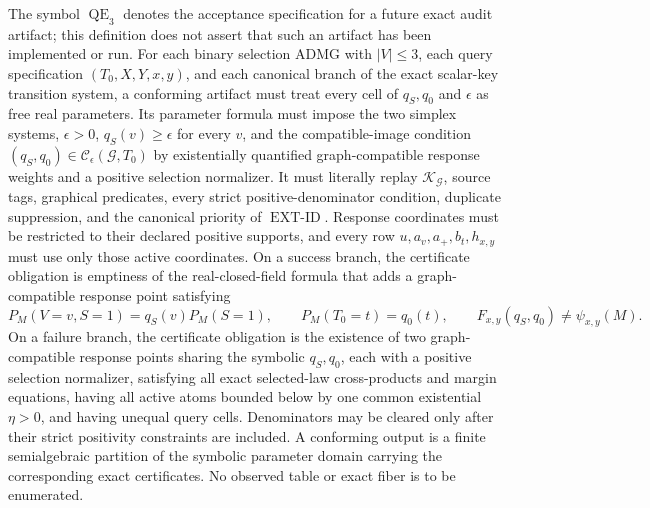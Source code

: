 The symbol \(\operatorname{QE}_3\) denotes the acceptance specification for a future exact audit artifact; this definition does not assert that such an artifact has been implemented or run.  For each binary selection ADMG with \(\lvert V\rvert\leq 3\), each query specification \((T_0,X,Y,x,y)\), and each canonical branch of the exact scalar-key transition system, a conforming artifact must treat every cell of \(q_S,q_0\) and \(\epsilon\) as free real parameters.  Its parameter formula must impose the two simplex systems, \(\epsilon>0\), \(q_S(v)\geq\epsilon\) for every \(v\), and the compatible-image condition \((q_S,q_0)\in\mathcal C_{\epsilon}(\mathcal G,T_0)\) by existentially quantified graph-compatible response weights and a positive selection normalizer.  It must literally replay \(\mathscr K_{\mathcal G}\), source tags, graphical predicates, every strict positive-denominator condition, duplicate suppression, and the canonical priority of \(\operatorname{EXT\text{-}ID}\).  Response coordinates must be restricted to their declared positive supports, and every row \(u,a_v,a_+,b_t,h_{x,y}\) must use only those active coordinates.  On a success branch, the certificate obligation is emptiness of the real-closed-field formula that adds a graph-compatible response point satisfying
\[
 P_M(V=v,S=1)=q_S(v)P_M(S=1),\qquad
 P_M(T_0=t)=q_0(t),\qquad
 F_{x,y}(q_S,q_0)\neq\psi_{x,y}(M).
\]
On a failure branch, the certificate obligation is the existence of two graph-compatible response points sharing the symbolic \(q_S,q_0\), each with a positive selection normalizer, satisfying all exact selected-law cross-products and margin equations, having all active atoms bounded below by one common existential \(\eta>0\), and having unequal query cells.  Denominators may be cleared only after their strict positivity constraints are included.  A conforming output is a finite semialgebraic partition of the symbolic parameter domain carrying the corresponding exact certificates.  No observed table or exact fiber is to be enumerated.